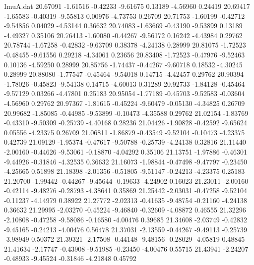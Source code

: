 \begin{filecontents}{ImuA.dat}
  20.67091   -1.61516   -0.42233   -9.61675    0.13189   -4.56960    0.24419
  20.69417   -1.65583   -0.40319   -9.55813    0.00976   -4.73753    0.26709
  20.71753   -1.60199   -0.42712   -9.54856    0.04029   -4.53144    0.36632
  20.74083   -1.63669   -0.43190   -9.53899    0.13189   -4.49327    0.35106
  20.76413   -1.60080   -0.44267   -9.56172    0.16242   -4.43984    0.29762
  20.78744   -1.67258   -0.42832   -9.63709    0.38378   -4.24138    0.28999
  20.81075   -1.72523   -0.48455   -9.61556    0.29218   -4.34061    0.23656
  20.83408   -1.72523   -0.47976   -9.52463    0.10136   -4.59250    0.28999
  20.85756   -1.74437   -0.44267   -9.60718    0.18532   -4.30245    0.28999
  20.88080   -1.77547   -0.45464   -9.54018    0.14715   -4.42457    0.29762
  20.90394   -1.78026   -0.45823   -9.54138    0.14715   -4.60013    0.31289
  20.92733   -1.84128   -0.45464   -9.57129    0.03266   -4.47801    0.25183
  20.95054   -1.77189   -0.45703   -9.52583   -0.03604   -4.56960    0.29762
  20.97367   -1.81615   -0.45224   -9.60479   -0.05130   -4.34825    0.26709
  20.99682   -1.85085   -0.44985   -9.53899   -0.10473   -4.35588    0.29762
  21.02154   -1.83769   -0.43310   -9.50309   -0.25739   -4.40168    0.28236
  21.04426   -1.90828   -0.42592   -9.65624    0.05556   -4.23375    0.26709
  21.06811   -1.86879   -0.43549   -9.52104   -0.10473   -4.23375    0.42739
  21.09129   -1.95374   -0.47617   -9.50788   -0.25739   -4.24138    0.32816
  21.11440   -2.00160   -0.44626   -9.53061   -0.18870   -4.04292    0.35106
  21.13751   -1.97886   -0.46301   -9.44926   -0.31846   -4.32535    0.36632
  21.16073   -1.98844   -0.47498   -9.47797   -0.23450   -4.25665    0.51898
  21.18398   -2.01356   -0.51805   -9.51147   -0.24213   -4.23375    0.25183
  21.20700   -1.99442   -0.44267   -9.45644   -0.19633   -4.24902    0.16023
  21.23011   -2.00160   -0.42114   -9.48276   -0.28793   -4.38641    0.35869
  21.25442   -2.03031   -0.47258   -9.52104   -0.11237   -4.14979    0.38922
  21.27772   -2.02313   -0.41635   -9.48754   -0.21160   -4.24138    0.36632
  21.29995   -2.03270   -0.45224   -9.46840   -0.32609   -4.08872    0.46555
  21.32296   -2.10808   -0.47258   -9.58086   -0.16580   -4.00476    0.39685
  21.34608   -2.03749   -0.42832   -9.45165   -0.24213   -4.00476    0.56478
  21.37031   -2.13559   -0.44267   -9.49113   -0.25739   -3.98949    0.50372
  21.39321   -2.17508   -0.44148   -9.48156   -0.28029   -4.05819    0.48845
  21.41634   -2.17747   -0.43908   -9.51985   -0.23450   -4.00476    0.55715
  21.43941   -2.24207   -0.48933   -9.45524   -0.31846   -4.21848    0.45792

\end{filecontents}
